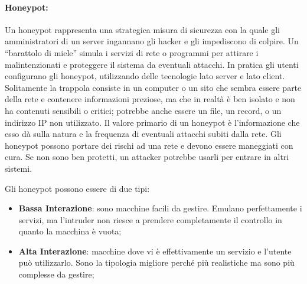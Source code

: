 \paragraph{Honeypot: } %
Un honeypot rappresenta una strategica misura di sicurezza con la quale gli
amministratori
di un server ingannano gli hacker e gli impediscono di colpire.
Un “barattolo di miele” simula i
servizi di rete o programmi per attirare i malintenzionati e proteggere il
sistema da eventuali
attacchi. In pratica gli utenti configurano gli honeypot, utilizzando delle
tecnologie lato server e lato
client. Solitamente la trappola consiste in un computer o un sito che sembra
essere parte della rete
e contenere informazioni preziose, ma che in realtà è ben isolato e non ha
contenuti sensibili o
critici; potrebbe anche essere un file, un record, o un indirizzo IP non utilizzato.
Il valore primario di un honeypot è l'informazione che esso dà sulla natura e la
frequenza di
eventuali attacchi subiti dalla rete.
Gli honeypot possono portare dei rischi ad una rete e devono essere maneggiati
con cura. Se non
sono ben protetti, un attacker potrebbe usarli per entrare in altri sistemi.

Gli honeypot possono essere di due tipi:
\begin{itemize}
      \item \textbf{Bassa Interazione}: sono macchine facili da gestire. Emulano perfettamente
            i servizi, ma l'intruder non riesce a prendere completamente il controllo in
            quanto la macchina è vuota;
      \item \textbf{Alta Interazione}: macchine dove vi è effettivamente un servizio e
            l'utente può utilizzarlo.
            Sono la tipologia migliore perché più realistiche ma sono più complesse
            da gestire;
\end{itemize}